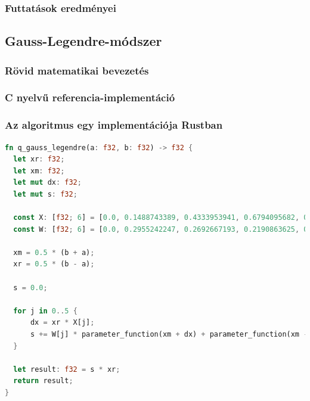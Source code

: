 \subsubsection{Futtatások eredményei}

\subsection{Gauss-Legendre-módszer}
\subsubsection{Rövid matematikai bevezetés}
\subsubsection{C nyelvű referencia-implementáció}
\subsubsection{Az algoritmus egy implementációja Rustban}
\begin{lstlisting}[language=Rust]
fn q_gauss_legendre(a: f32, b: f32) -> f32 {
  let xr: f32;
  let xm: f32;
  let mut dx: f32;
  let mut s: f32;
  
  const X: [f32; 6] = [0.0, 0.1488743389, 0.4333953941, 0.6794095682, 0.8650633666,0.9739065285];
  const W: [f32; 6] = [0.0, 0.2955242247, 0.2692667193, 0.2190863625, 0.1494513491, 0.0666713443];
  
  xm = 0.5 * (b + a);
  xr = 0.5 * (b - a);
  
  s = 0.0;
  
  for j in 0..5 {
	  dx = xr * X[j];
	  s += W[j] * parameter_function(xm + dx) + parameter_function(xm - dx);
  }
  
  let result: f32 = s * xr;
  return result;
}  
\end{lstlisting}
